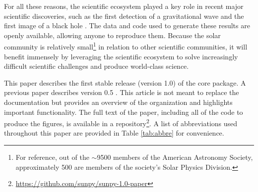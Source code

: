 For all these reasons, the scientific \python ecosystem played a key role in recent major scientific discoveries, such as the first detection of a gravitational wave \citep{ligo_scientific_collaboration_and_virgo_collaboration_observation_2016} and the first image of a black hole \citep{collaboration_first_2019}.
The data and code used to generate these results are openly available, allowing anyone to reproduce them.
Because the solar community is relatively small\footnote{For reference, out of the $\sim$9500 members of the American Astronomy Society, approximately 500 are members of the society's Solar Physics Division.} in relation to other scientific communities, it will benefit immensely by leveraging the scientific \python ecosystem to solve increasingly difficult scientific challenges and produce world-class science.

This paper describes the first stable release (version 1.0) of the \sunpypkg core package.
A previous paper describes version 0.5 \citep{Community:2015cy}.
This article is not meant to replace the \sunpypkg documentation but provides an overview of the organization and highlights important functionality.
The full text of the paper, including all of the code to produce the figures, is available in a \github repository\footnote{\url{https://github.com/sunpy/sunpy-1.0-paper}}.
A list of abbreviations used throughout this paper are provided in Table \ref{tab:abbre} for convenience.
